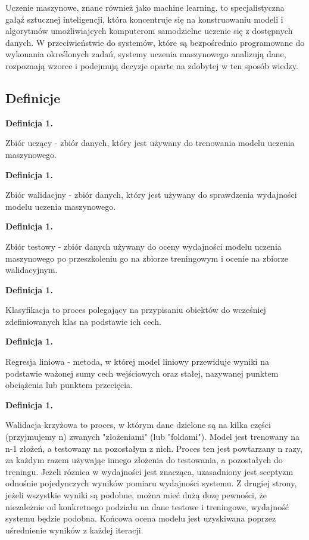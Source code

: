 Uczenie maszynowe, znane również jako machine learning, to specjalistyczna gałąź sztucznej inteligencji,
która koncentruje się na konstruowaniu modeli i algorytmów umożliwiajcych komputerom samodzielne uczenie się z dostępnych danych.
W przeciwieństwie do systemów, które są bezpośrednio programowane do wykonania określonych zadań,
systemy uczenia maszynowego analizują dane, rozpoznają wzorce i podejmują decyzje oparte na zdobytej w ten sposób wiedzy.

\subsection{Definicje}

\newcommand{\mlDefinitionIndex}{1}
\newcommand{\incrementMlDefinitionIndex} {
    \pgfmathtruncatemacro{\mlDefinitionIndex}{\mlDefinitionIndex + 1}
}

\noindent
\textbf{Definicja \mlDefinitionIndex.}
\incrementMlDefinitionIndex
Zbiór uczący - zbiór danych, który jest używany do trenowania modelu uczenia maszynowego.

\noindent
\textbf{Definicja \mlDefinitionIndex.}
\incrementMlDefinitionIndex
Zbiór walidacjny - zbiór danych, który jest używany do sprawdzenia wydajności modelu uczenia maszynowego.

\noindent
\textbf{Definicja \mlDefinitionIndex.}
\incrementMlDefinitionIndex
Zbiór testowy - zbiór danych używany do oceny wydajności modelu uczenia maszynowego
po przeszkoleniu go na zbiorze treningowym i ocenie na zbiorze walidacyjnym.

\noindent
\textbf{Definicja \mlDefinitionIndex.}
\incrementMlDefinitionIndex
Klasyfikacja to proces polegający na przypisaniu obiektów do wcześniej zdefiniowanych klas na podstawie ich cech.

\noindent
\textbf{Definicja \mlDefinitionIndex.}
\incrementMlDefinitionIndex
Regresja liniowa - metoda, w której model liniowy przewiduje wyniki na podstawie ważonej sumy cech wejściowych oraz stałej,
nazywanej punktem obciążenia lub punktem przecięcia.

\noindent
\textbf{Definicja \mlDefinitionIndex.}
\incrementMlDefinitionIndex
Walidacja krzyżowa to proces, w którym dane dzielone są na kilka części (przyjmujemy n) zwanych "złożeniami" (lub "foldami").
Model jest trenowany na n-1 złożeń, a testowany na pozostałym z nich.
Proces ten jest powtarzany n razy, za każdym razem używając innego złożenia do testowania,
a pozostałych do treningu.
Jeżeli róznica w wydajności jest znacząca, uzasadniony jest sceptyzm odnośnie pojedynczych wyników pomiaru wydajności systemu.
Z drugiej strony, jeżeli wszystkie wyniki są podobne, można mieć dużą dozę pewności, że niezależnie od konkretnego podziału
na dane testowe i treningowe, wydajność systemu będzie podobna.
Końcowa ocena modelu jest uzyskiwana poprzez uśrednienie wyników z każdej iteracji.

